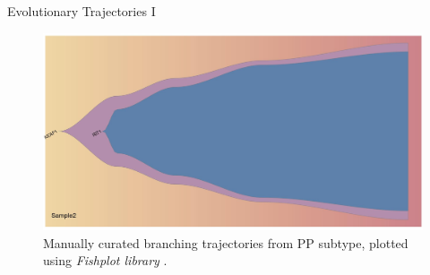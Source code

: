 \documentclass{beamer}
\begin{document}
\begin{frame}{Evolutionary Trajectories I}
{\begin{figure}
      \includegraphics[scale = 0.09]{img/branch2.jpg}
      \caption{Manually curated branching trajectories from PP subtype, plotted
        using \textit{Fishplot library} \cite{fishplot}.} 
    \end{figure}
  }
\end{frame}
\end{document}
